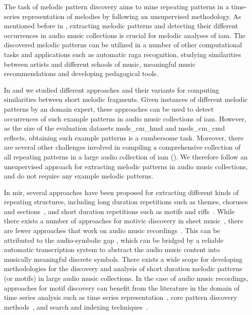 The task of melodic pattern discovery aims to mine repeating patterns in a time-series representation of melodies by following an unsupervised methodology. As mentioned before in , extracting melodic patterns and detecting their different occurrences in audio music collections is crucial for melodic analyses of \gls{iam}. The discovered melodic patterns can be utilized in a number of other computational tasks and applications such as automatic \gls{raga} recognition, studying similarities between artists and different schools of music, meaningful music recommendations and developing pedagogical tools.

In  and  we studied different approaches and their variants for computing similarities between short melodic fragments. Given instances of different melodic patterns by an domain expert, these approaches can be used to detect occurrences of such example patterns in audio music collections of \gls{iam}. However, as the size of the evaluation datasets \acrshort{msds_cm_hmd} and \acrshort{msds_cm_cmd} reflects, obtaining such example patterns is a cumbersome task. Moreover, there are several other challenges involved in compiling a comprehensive collection of all repeating patterns in a large audio collection of \gls{iam} (). We therefore follow an unsupervised approach for extracting melodic patterns in audio music collections, and do not require any example melodic patterns. 

In \gls{mir}, several approaches have been proposed for extracting different kinds of repeating structures, including long duration repetitions such as themes, choruses and sections~\cite{paulus2010state}, and short duration repetitions such as motifs and riffs~\cite{Janssen2013}. While there exists a number of approaches for motivic discovery in sheet music~\cite{Lartillot2005}, there are fewer approaches that work on audio music recordings~\cite{dannenberg2003pattern}. This can be attributed to the audio-symbolic gap \cite{collins2014bridging}, which can be bridged by a reliable automatic transcription system to abstract the audio music content into musically meaningful discrete symbols. There exists a wide scope for developing methodologies for the discovery and analysis of short duration melodic patterns (or motifs) in large audio music collections. In the case of audio music recordings, approaches for motif discovery can benefit from the literature in the domain of time series analysis such as time series representation~\cite{Lin2003}, core pattern discovery methods~\cite{Mueen2009}, and search and indexing techniques~\cite{Rakthanmanon2013}.

